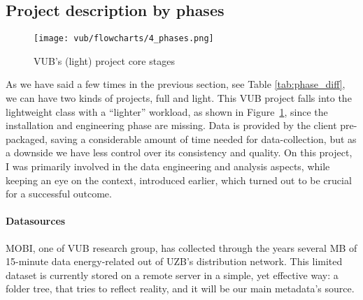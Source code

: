 \subsection{Project description by phases}
\begin{figure}[ht]
    \texttt{[image: vub/flowcharts/4\_phases.png]}
    \caption{\ac{VUB}'s (light) project core stages}
    \label{fig:vub_stages}
\end{figure}
As we have said a few times in the previous section, see Table \ref{tab:phase_diff}, we can have two kinds of projects, full and light. 
This \ac{VUB} project falls into the lightweight class with a ``lighter'' workload, as shown in Figure~\ref{fig:vub_stages}, since the installation and engineering phase are missing. 
Data is provided by the client pre-packaged, saving a considerable amount of time needed for data-collection, but as a downside we have less control over its consistency and quality.
On this project, I was primarily involved in the data engineering and analysis aspects, while keeping an eye on the context, introduced earlier, which turned out to be crucial for a successful outcome.

\paragraph{Datasources}
MOBI, one of \ac{VUB} research group, has collected through the years several MB of 15-minute data energy-related out of \ac{UZB}'s distribution network.
This limited dataset is currently stored on a remote server in a simple, yet effective way: 
a folder tree, that tries to reflect reality, and it will be our main metadata's source. 

